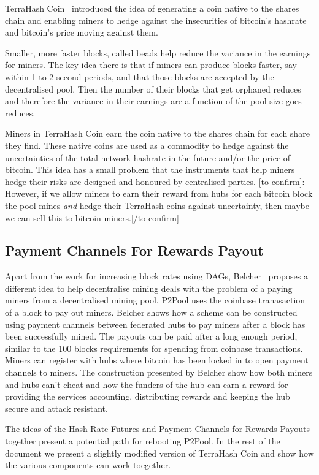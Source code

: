 \documentclass{article}
\begin{document}
TerraHash Coin~\cite{mcelrath:variance} introduced the idea of
generating a coin native to the shares chain and enabling miners to
hedge against the insecurities of bitcoin's hashrate and bitcoin's
price moving against them.

Smaller, more faster blocks, called beads help reduce the variance in
the earnings for miners. The key idea there is that if miners can
produce blocks faster, say within 1 to 2 second periods, and that
those blocks are accepted by the decentralised pool. Then the number
of their blocks that get orphaned reduces and therefore the variance
in their earnings are a function of the pool size goes reduces.

Miners in TerraHash Coin earn the coin native to the shares chain for
each share they find. These native coins are used as a commodity to
hedge against the uncertainties of the total network hashrate in the
future and/or the price of bitcoin. This idea has a small problem that
the instruments that help miners hedge their risks are designed and
honoured by centralised parties. [to confirm]: However, if we allow
miners to earn their reward from hubs for each bitcoin block the pool
mines \emph{and} hedge their TerraHash coins against uncertainty, then
maybe we can sell this to bitcoin miners.[/to confirm]

\subsection{Payment Channels For Rewards Payout}

Apart from the work for increasing block rates using DAGs,
Belcher~\cite{channels-for-rewards} proposes a different idea to help
decentralise mining deals with the problem of a paying miners from a
decentralised mining pool. P2Pool uses the coinbase tranasaction of a
block to pay out miners. Belcher shows how a scheme can be constructed
using payment channels between federated hubs to pay miners after a
block has been successfully mined. The payouts can be paid after a
long enough period, similar to the 100 blocks requirements for
spending from coinbase transactions. Miners can register with hubs
where bitcoin has been locked in to open payment channels to
miners. The construction presented by Belcher show how both miners and
hubs can't cheat and how the funders of the hub can earn a reward for
providing the services accounting, distributing rewards and keeping
the hub secure and attack resistant.

The ideas of the Hash Rate Futures and Payment Channels for Rewards
Payouts together present a potential path for rebooting P2Pool. In the
rest of the document we present a slightly modified version of
TerraHash Coin and show how the various components can work toegether.
\end{document}
